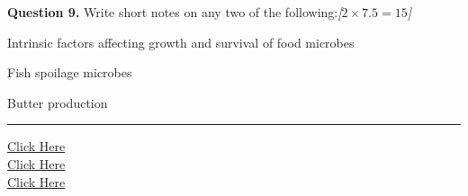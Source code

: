 \documentclass[11pt,a4paper]{article}
\newcommand{\pts}[1]{\hfill   \textit{[#1]}}
\begin{document}
\medskip


\noindent   \textbf{Question 9.} Write short notes on any two of the following:\pts{$2  \times 7.5 = 15$}

\begin{parts}
  \item Intrinsic factors affecting growth and survival of food microbes
  \item Fish spoilage microbes
  \item Butter production
\end{parts}

\vfill
\rule{\linewidth}{0.4pt}

\begin{center}\small
\href{https://bhu-exam.vercel.app/}{Click Here}\\[4pt]\href{https://me-aryan.vercel.app/}{Click Here}\\[4pt]\href{https://quashan-me.vercel.app/}{Click Here}
\end{center}
\end{document}
